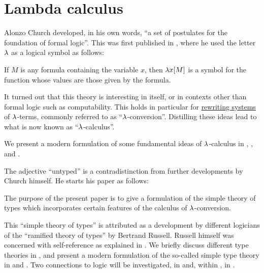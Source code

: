 \chapter{Lambda calculus}\label{ch:lambda_calculus}

Alonzo Church developed, in his own words, \enquote{a set of postulates for the foundation of formal logic}. This was first published in \cite{Church1932Untyped}, where he used the letter \( \mathrm{\lambda} \) as a logical symbol as follows:
\begin{displayquote}
  If \( M \) is any formula containing the variable \( x \), then \( \mathrm{\lambda} x [M] \) is a symbol for the function whose values are those given by the formula.
\end{displayquote}

It turned out that this theory is interesting in itself, or in contexts other than formal logic such as computability. This holds in particular for \hyperref[def:rewriting_system]{rewriting systems} of \( \mathrm{\lambda} \)-terms, commonly referred to as \enquote{\( \mathrm{\lambda} \)-conversion}. Distilling these ideas lead to what is now known as \enquote{\( \mathrm{\lambda} \)-calculus}.

We present a modern formulation of some fundamental ideas of \( \mathrm{\lambda} \)-calculus in , ,  and .

The adjective \enquote{untyped} is a contradistinction from further developments by Church himself. He starts his paper \cite{Church1940STT} as follows:
\begin{displayquote}
  The purpose of the present paper is to give a formulation of the simple theory of types which incorporates certain features of the calculus of \( \mathrm{\lambda} \)-conversion.
\end{displayquote}

This \enquote{simple theory of types} is attributed as a development by different logicians of the \enquote{ramified theory of types} by Bertrand Russell. Russell himself was concerned with self-reference as explained in . We briefly discuss different type theories in , and present a modern formulation of the so-called simple type theory in  and . Two connections to logic will be investigated, in  and, within , in .
